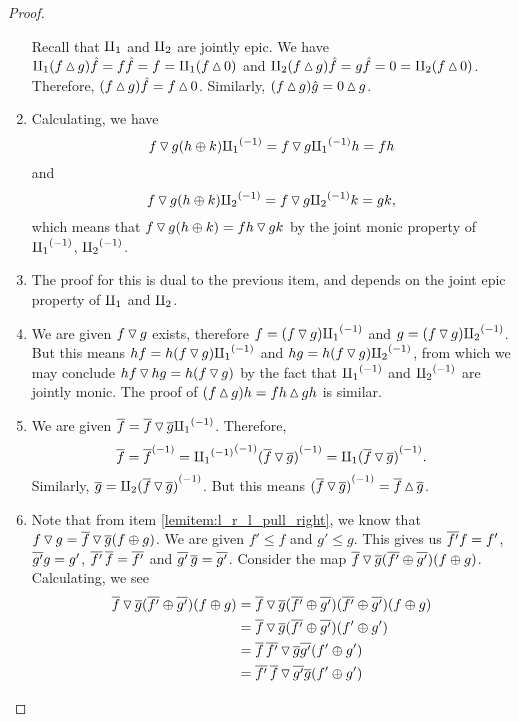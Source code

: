 \begin{proof}
\begin{enumerate}[{(}i{)}]
      Recall that $\amalg_{1}$ and $\amalg_{2}$ are jointly epic. We have
      $\amalg_{1}(f \operatorname{\vartriangle} g)\hat{f} = f\hat{f} = f = \amalg_{1}(f\operatorname{\vartriangle} 0) $ and
      $\amalg_{2}(f \operatorname{\vartriangle} g)\hat{f} = g\hat{f} = 0= \amalg_{2}(f\operatorname{\vartriangle} 0)$.
      Therefore, $(f \operatorname{\vartriangle} g)\hat{f} = f \operatorname{\vartriangle} 0$. Similarly,
      $(f \operatorname{\vartriangle} g) \hat{g} = 0 \operatorname{\vartriangle} g$.
    \item Calculating, we have
      \[
        f \operatorname{\triangledown} g (h \oplus k) {\amalg_{1}}^{(-1)} = f\operatorname{\triangledown} g {\amalg_{1}}^{(-1)} h = f h
      \]
      and
      \[
        f \operatorname{\triangledown} g (h \oplus k) {\amalg_{2}}^{(-1)} = f\operatorname{\triangledown} g {\amalg_{2}}^{(-1)} k = g k,
      \]
      which means that
      $f \operatorname{\triangledown} g (h \oplus k) = f h \operatorname{\triangledown} g k$ by the joint monic property of ${\amalg_{1}}^{(-1)}$, ${\amalg_{2}}^{(-1)}$.
    \item The proof for this is dual to the previous item, and depends on the joint epic property
      of $\amalg_{1}$ and $\amalg_{2}$.
    \item We are given $f\operatorname{\triangledown} g$ exists, therefore $f = (f\operatorname{\triangledown} g){\amalg_{1}}^{(-1)}$ and
      $g = (f\operatorname{\triangledown} g){\amalg_{2}}^{(-1)}$. But this means $hf = h(f\operatorname{\triangledown} g){\amalg_{1}}^{(-1)}$ and
      $hg = h(f\operatorname{\triangledown} g){\amalg_{2}}^{(-1)}$, from which we may conclude $hf \operatorname{\triangledown} hg = h(f\operatorname{\triangledown} g)$ by
      the fact that ${\amalg_{1}}^{(-1)}$ and ${\amalg_{2}}^{(-1)}$ are jointly monic. The proof of
      $(f\operatorname{\vartriangle} g)h = f h \operatorname{\vartriangle} g h$ is similar.
    \item We are given $\overline{f} = \overline{f}\operatorname{\triangledown}\overline{g} {\amalg_{1}}^{(-1)}$. Therefore,
      \[
        \overline{f} = {\overline{f}}^{(-1)} = {{\amalg_{1}}^{(-1)}}^{(-1)}{(\overline{f}\operatorname{\triangledown}\overline{g})}^{(-1)}
          = \amalg_{1} {(\overline{f}\operatorname{\triangledown}\overline{g})}^{(-1)}.
      \]
      Similarly, $\overline{g} = \amalg_{2} {(\overline{f}\operatorname{\triangledown}\overline{g})}^{(-1)}$. But this means
      ${(\overline{f}\operatorname{\triangledown}\overline{g})}^{(-1)} = \overline{f}\operatorname{\vartriangle}\overline{g}$.
    \item Note that from item \ref{lemitem:l_r_l_pull_right}, we know that
      $f \operatorname{\triangledown} g  = \overline{f} \operatorname{\triangledown} \overline{g} (f\oplus g)$. We are given $f' \le f$ and $g' \le g$. This
      gives us $\overline{f'}f =f'$, $\overline{g'}g =g'$, $\overline{f'}\,\overline{f} =\overline{f'}$ and
      $\overline{g'}\,\overline{g} =\overline{g'}$. Consider the map
      $\overline{f} \operatorname{\triangledown} \overline{g} (\overline{f'}\oplus\overline{g'})(f\oplus g)$. Calculating, we see
      \begin{align*}
        \rst{f} \tjdown \rst{g} (\rst{f'}\+\rst{g'})(f\+g)
          &= \rst{f} \tjdown \rst{g} (\rst{f'}\+\rst{g'})(\rst{f'}\+\rst{g'})(f\+g) \\
          & = \rst{f} \tjdown \rst{g} (\rst{f'}\+\rst{g'})(f'\+g') \\
          & = \rst{f}\,\rst{f'} \tjdown \rst{g} \rst{g'} (f'\+g') \\
          & = \rst{f'}\,\rst{f} \tjdown \rst{g'} \rst{g} (f'\+g') \\

\end{align*}
\end{enumerate}
\end{proof}
